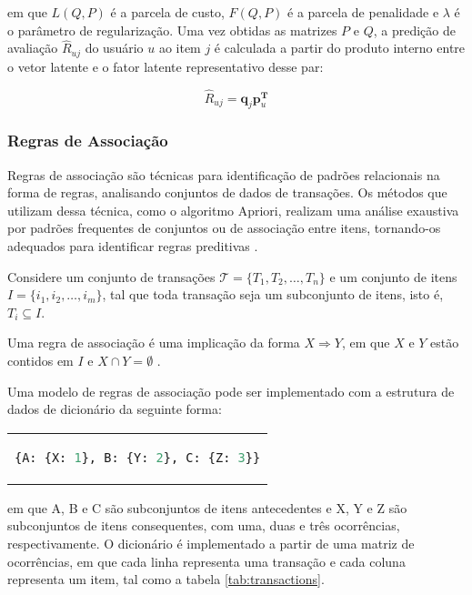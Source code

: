 em que $L(Q,P)$ é a parcela de custo, $F(Q,P)$ é a parcela de penalidade e
$\lambda$ é o parâmetro de regularização. Uma vez obtidas as matrizes $P$ e $Q$,
a predição de avaliação $\hat{R}_{uj}$ do usuário $u$ ao item $j$ é calculada a
partir do produto interno entre o vetor latente e o fator latente representativo
desse par:

\begin{equation} \label{fator_latente}
    \hat{R}_{uj} = \mathbf{q}_j \mathbf{p}_u^{\mathbf{T}}
\end{equation}


\subsubsection{Regras de Associação}
Regras de associação são técnicas para identificação de padrões relacionais
na forma de regras, analisando conjuntos de dados de transações. Os métodos que
utilizam dessa técnica, como o algoritmo Apriori, realizam uma análise exaustiva
por padrões frequentes de conjuntos ou de associação entre itens, tornando-os
adequados para identificar regras preditivas \cite{jannach2011recommender}.

Considere um conjunto de transações $\mathcal{T} = \{T_1, T_2, \dots, T_n\}$ e
um conjunto de itens $I = \{i_1, i_2, \dots, i_m\}$, tal que toda transação seja
um subconjunto de itens, isto é, $T_i \subseteq I$.

Uma regra de associação é uma
implicação da forma $X \Rightarrow Y$, em que $X$ e $Y$ estão contidos em $I$ e
$X \cap Y = \emptyset$ \cite{ordonez2011evaluating}.

Uma modelo de regras de associação
pode ser implementado com a estrutura de dados de dicionário da seguinte forma:

\begin{center}
    \begin{tabular}{c}

\begin{lstlisting}[language=Python]
    {A: {X: 1}, B: {Y: 2}, C: {Z: 3}}
\end{lstlisting}
\end{tabular}
\end{center}
em que A, B e C são subconjuntos de itens antecedentes e X, Y e Z são
subconjuntos de itens consequentes, com uma, duas e três ocorrências,
respectivamente. O dicionário é implementado a partir de uma matriz de ocorrências,
em que cada linha representa uma transação e cada coluna representa um item, tal
como a tabela \ref{tab:transactions}.

